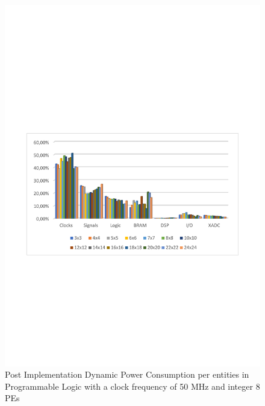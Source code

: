 \begin{itemize}
\begin{figure}[!htbp]
\includegraphics[scale=0.7,angle=0]{./figure/graphs/power_pldyn_div_int8_freq_50mhz.pdf}
\caption{Post Implementation Dynamic Power Consumption per entities in Programmable Logic with a clock frequency of 50 MHz and integer 8 PEs}
\label{fig:dynpowint8ent50}
\end{figure}
\begin{figure}[!htbp]
\centering
\captionsetup{justification=centering}

\end{figure}
\end{itemize}
